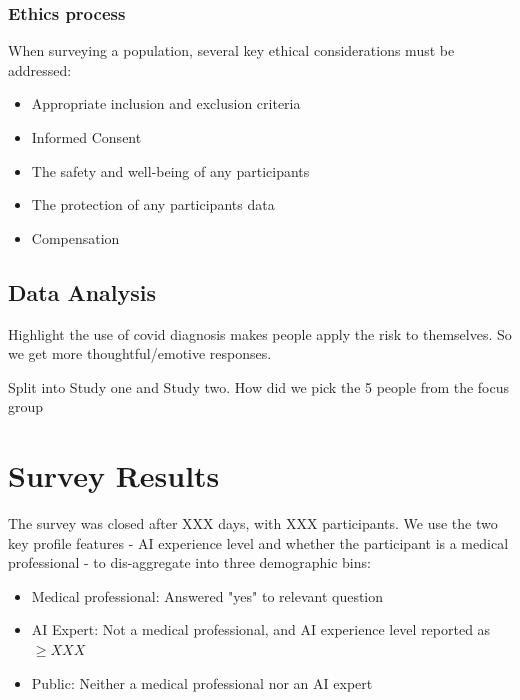 \documentclass[manuscript,screen,review]{acmart}
\begin{document}
\subsubsection{Ethics process}

When surveying a population, several key ethical considerations must be addressed:
\begin{itemize}
    \item Appropriate inclusion and exclusion criteria
    \item Informed Consent
    \item The safety and well-being of any participants
    \item The protection of any participants data 
    \item Compensation
\end{itemize}
 

\subsection{Data Analysis}


Highlight the use of covid diagnosis makes people apply the risk to themselves. So we get more thoughtful/emotive responses.

Split into Study one and Study two.
How did we pick the 5 people from the focus group

\section{Survey Results}




The survey was closed after XXX days, with XXX participants. We use the two key profile features - AI experience level and whether the participant is a medical professional - to dis-aggregate into three demographic bins:

\begin{itemize}
    \item Medical professional: Answered "yes" to relevant question
    \item AI Expert: Not a medical professional, and AI experience level reported as $\geq XXX$
    \item Public: Neither a medical professional nor an AI expert
\end{itemize}
\end{document}
